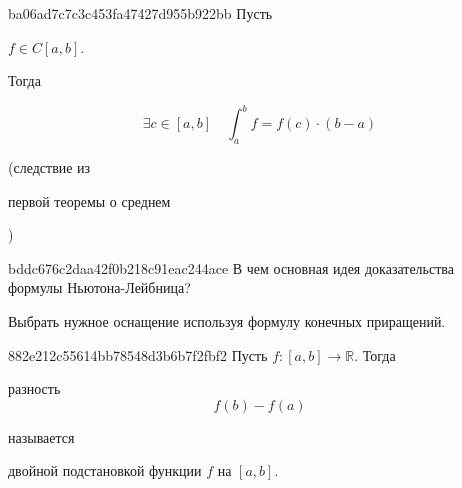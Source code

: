 \begin{note}{ba06ad7c7c3c453fa47427d955b922bb}
    Пусть \begin{icloze}{2}\({ f \in C[a, b] }\).\end{icloze}
    Тогда
    \begin{icloze}{1}
        \[
            \exists c \in [a, b] \quad \int_{a}^{b} f = f(c) \cdot (b - a)
        \]
    \end{icloze}

    \begin{center}
        \tiny
        (следствие из \begin{icloze}{3}первой теоремы о среднем\end{icloze})
    \end{center}
\end{note}


\begin{note}{bddc676c2daa42f0b218c91eac244ace}
    В чем основная идея доказательства формулы Ньютона-Лейбница?

    \begin{cloze}{1}
        Выбрать нужное оснащение используя формулу конечных приращений.
    \end{cloze}
\end{note}

\begin{note}{882e212c55614bb78548d3b6b7f2fbf2}
    Пусть \({ f : [a, b] \to \mathbb R }\). Тогда
    \begin{icloze}{1}
        разность
        \[
            f(b) - f(a)
        \]
    \end{icloze}
    называется \begin{icloze}{2}двойной подстановкой функции \({ f }\)  на \({ [a, b] }\).\end{icloze}
\end{note}


